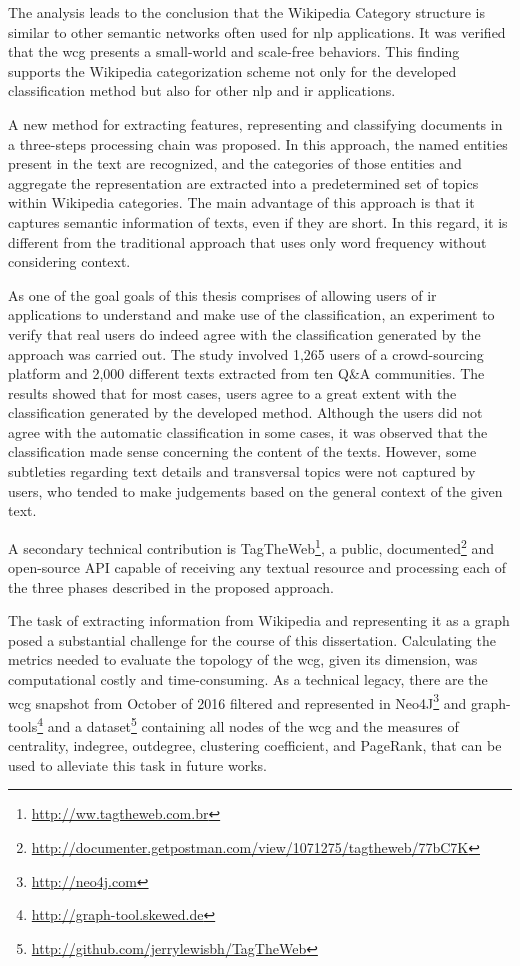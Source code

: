 The analysis leads to the conclusion that the Wikipedia Category structure is similar to other semantic networks often used for \gls{nlp} applications. It was verified that the \gls{wcg} presents a small-world and scale-free behaviors. This finding supports the Wikipedia categorization scheme not only for the developed classification method but also for other \gls{nlp} and \gls{ir} applications.

A new method for extracting features, representing and classifying documents in a three-steps processing chain was proposed. In this approach, the named entities present in the text are recognized, and the categories of those entities and aggregate the representation are extracted into a predetermined set of topics within Wikipedia categories. The main advantage of this approach is that it captures semantic information of texts, even if they are short. In this regard, it is different from the traditional approach that uses only word frequency without considering context.

As one of the goal goals of this thesis comprises of allowing users of \gls{ir} applications to understand and make use of the classification, an experiment to verify that real users do indeed agree with the classification generated by the approach was carried out. The study involved 1,265 users of a  crowd-sourcing platform and 2,000 different texts extracted from ten Q\&A communities. The results showed that for most cases, users agree to a great extent with the classification generated by the developed method. Although the users did not agree with the automatic classification in some cases, it was observed that the classification made sense concerning the content of the texts. However, some subtleties regarding text details and transversal topics were not captured by users, who tended to make judgements based on the general context of the given text.


A secondary technical contribution is TagTheWeb\footnote{\url{http://ww.tagtheweb.com.br}},  a public, documented\footnote{\url{http://documenter.getpostman.com/view/1071275/tagtheweb/77bC7K}} and open-source API capable of receiving any textual resource and processing each of the three phases described in the proposed approach.

The task of extracting information from Wikipedia and representing it as a graph posed a substantial challenge for the course of this dissertation. Calculating the metrics needed to evaluate the topology of the \gls{wcg}, given its dimension, was computational costly and time-consuming. As a technical legacy, there are the \gls{wcg} snapshot from October of 2016 filtered and represented in Neo4J\footnote{\url{http://neo4j.com}} and graph-tools\footnote{\url{http://graph-tool.skewed.de}} and a dataset\footnote {\url{http://github.com/jerrylewisbh/TagTheWeb}} containing all nodes of the \gls{wcg} and the measures of centrality, indegree, outdegree, clustering coefficient, and PageRank, that can be used to alleviate this task in future works.

